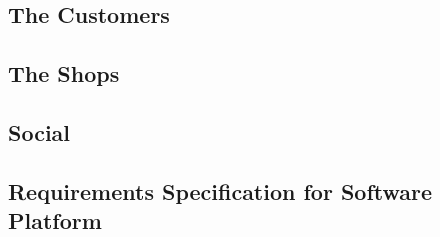 \lipsum[1]

\subsection{The Customers}
\lipsum[1-2]

\subsection{The Shops}
\lipsum[1-2]

\subsection{Social}
\lipsum[1]

\subsection{Requirements Specification for Software Platform}
\lipsum[1-3]